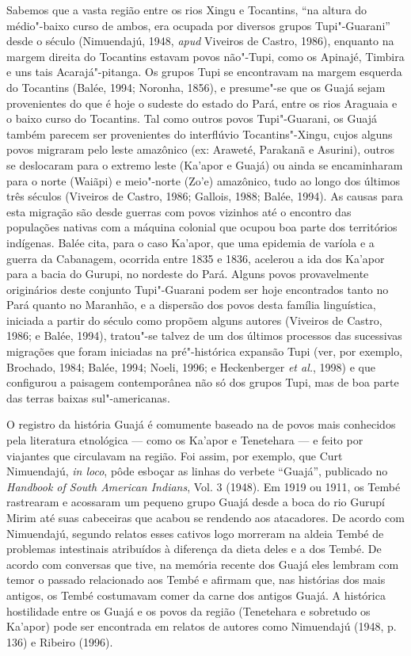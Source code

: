 Sabemos que a vasta região entre os rios Xingu e Tocantins, ``na altura
do médio"-baixo curso de ambos, era ocupada por diversos grupos
Tupi"-Guarani'' desde o século  (Nimuendajú, 1948, \emph{apud} Viveiros de
Castro, 1986), enquanto na margem direita do Tocantins estavam povos
não"-Tupi, como os Apinajé, Timbira e uns tais Acarajá"-pitanga. Os grupos
Tupi se encontravam na margem esquerda do Tocantins (Balée, 1994;
Noronha, 1856), e presume"-se que os Guajá sejam provenientes do que é
hoje o sudeste do estado do Pará, entre os rios Araguaia e o baixo curso
do Tocantins. Tal como outros povos Tupi"-Guarani, os Guajá também
parecem ser provenientes do interflúvio Tocantins"-Xingu, cujos alguns
povos migraram pelo leste amazônico (ex: Araweté, Parakanã e Asurini),
outros se deslocaram para o extremo leste (Ka'apor e Guajá) ou ainda se
encaminharam para o norte (Waiãpi) e meio"-norte (Zo'e) amazônico, tudo
ao longo dos últimos três séculos (Viveiros de Castro, 1986; Gallois,
1988; Balée, 1994). As causas para esta migração são desde guerras com
povos vizinhos até o encontro das populações nativas com a máquina
colonial que ocupou boa parte dos territórios indígenas. Balée cita,
para o caso Ka'apor, que uma epidemia de varíola e a guerra da
Cabanagem, ocorrida entre 1835 e 1836, acelerou a ida dos Ka'apor para a
bacia do Gurupi, no nordeste do Pará. Alguns povos provavelmente
originários deste conjunto Tupi"-Guarani podem ser hoje encontrados tanto
no Pará quanto no Maranhão, e a dispersão dos povos desta família
linguística, iniciada a partir do século  como propõem alguns
autores (Viveiros de Castro, 1986; e Balée, 1994), tratou"-se talvez de
um dos últimos processos das sucessivas migrações que foram iniciadas na
pré"-histórica expansão Tupi (ver, por exemplo, Brochado, 1984; Balée,
1994; Noeli, 1996; e Heckenberger \emph{et al.}, 1998) e que configurou a
paisagem contemporânea não só dos grupos Tupi, mas de boa parte das
terras baixas sul"-americanas.

O registro da história Guajá é comumente baseado na de povos mais
conhecidos pela literatura etnológica --- como os Ka'apor e Tenetehara ---
e feito por viajantes que circulavam na região. Foi assim, por exemplo,
que Curt Nimuendajú, \emph{in loco}, pôde esboçar as linhas do verbete
``Guajá'', publicado no \emph{Handbook of South American Indians}, Vol. 3
(1948). Em 1919 ou 1911, os Tembé rastrearam e acossaram um pequeno
grupo Guajá desde a boca do rio Gurupí Mirim até suas cabeceiras que
acabou se rendendo aos atacadores. De acordo com Nimuendajú, segundo
relatos esses cativos logo morreram na aldeia Tembé de problemas
intestinais atribuídos à diferença da dieta deles e a dos Tembé. De
acordo com conversas que tive, na memória recente dos Guajá eles lembram
com temor o passado relacionado aos Tembé e afirmam que, nas histórias
dos mais antigos, os Tembé costumavam comer da carne dos antigos Guajá.
A histórica hostilidade entre os Guajá e os povos da região (Tenetehara
e sobretudo os Ka'apor) pode ser encontrada em relatos de autores como
Nimuendajú (1948, p. 136) e Ribeiro (1996).

